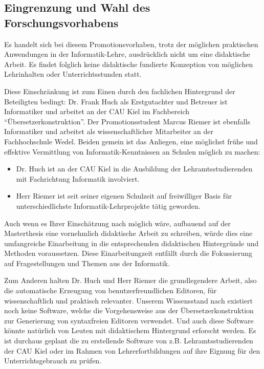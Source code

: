 \documentclass[paper=a4,fontsize=12pt,parskip=half]{scrartcl}
\begin{document}
\subsection{Eingrenzung und Wahl des Forschungsvorhabens}

Es handelt sich bei diesem Promotionsvorhaben, trotz der möglichen praktischen Anwendungen in der Informatik-Lehre, ausdrücklich nicht um eine didaktische Arbeit. Es findet folglich keine didaktische fundierte Konzeption von möglichen Lehrinhalten oder Unterrichtsstunden statt.

Diese Einschränkung ist zum Einen durch den fachlichen Hintergrund der Beteiligten bedingt: Dr. Frank Huch als Erstgutachter und Betreuer ist Informatiker und arbeitet an der CAU Kiel im Fachbereich \enquote{Übersetzerkonstruktion}. Der Promotionsstudent Marcus Riemer ist ebenfalls Informatiker und arbeitet als wissenschaftlicher Mitarbeiter an der Fachhochschule Wedel. Beiden gemein ist das Anliegen, eine möglichst frühe und effektive Vermittlung von Informatik-Kenntnissen an Schulen möglich zu machen:

\begin{itemize}
\item Dr. Huch ist an der CAU Kiel in die Ausbildung der Lehramtsstudierenden mit Fachrichtung Informatik involviert.
\item Herr Riemer ist seit seiner eigenen Schulzeit auf freiwilliger Basis für unterschiedlichste Informatik-Lehrprojekte tätig geworden.
\end{itemize}

Auch wenn es Ihrer Einschätzung nach möglich wäre, aufbauend auf der Masterthesis eine vornehmlich didaktische Arbeit zu schreiben, würde dies eine umfangreiche Einarbeitung in die entsprechenden didaktischen Hintergründe und Methoden voraussetzen. Diese Einarbeitungzeit entfällt durch die Fokussierung auf Fragestellungen und Themen aus der Informatik.

Zum Anderen halten Dr. Huch und Herr Riemer die grundlegendere Arbeit, also die automatische Erzeugung von benutzerfreundlichen Editoren, für wissenschaftlich und praktisch relevanter. Unserem Wissensstand nach existiert noch keine Software, welche die Vorgehensweise aus der Übersetzerkonstruktion zur Generierung von syntaxfreien Editoren verwendet. Und auch diese Software könnte natürlich von Leuten mit didaktischem Hintergrund erforscht werden. Es ist durchaus geplant die zu erstellende Software von z.B. Lehramtsstudierenden der CAU Kiel oder im Rahmen von Lehrerfortbildungen auf ihre Eignung für den Unterrichtsgebrauch zu prüfen.
\end{document}
